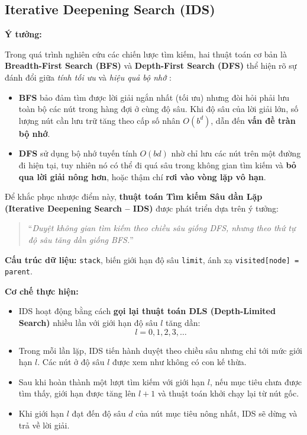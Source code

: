 \subsection{Iterative Deepening Search (IDS)}

\textbf{Ý tưởng: }

Trong quá trình nghiên cứu các chiến lược tìm kiếm, hai thuật toán cơ bản là \textbf{Breadth-First Search (BFS)} và 
\textbf{Depth-First Search (DFS)} thể hiện rõ sự đánh đổi giữa \textit{tính tối ưu} và \textit{hiệu quả bộ nhớ} \cite{russell2021}:

\begin{itemize}
    \item \textbf{BFS} bảo đảm tìm được lời giải ngắn nhất (tối ưu) nhưng đòi hỏi phải lưu toàn bộ các nút trong hàng đợi ở cùng độ sâu. 
    Khi độ sâu của lời giải lớn, số lượng nút cần lưu trữ tăng theo cấp số nhân $O(b^d)$, dẫn đến \textbf{vấn đề tràn bộ nhớ}.
    \item \textbf{DFS} sử dụng bộ nhớ tuyến tính $O(bd)$ nhờ chỉ lưu các nút trên một đường đi hiện tại, 
    tuy nhiên nó có thể đi quá sâu trong không gian tìm kiếm và \textbf{bỏ qua lời giải nông hơn}, 
    hoặc thậm chí \textbf{rơi vào vòng lặp vô hạn}.
\end{itemize}

Để khắc phục nhược điểm này, \textbf{thuật toán Tìm kiếm Sâu dần Lặp (Iterative Deepening Search – IDS)} được phát triển 
dựa trên ý tưởng:
\begin{quote}
    “\textit{Duyệt không gian tìm kiếm theo chiều sâu giống DFS, nhưng theo thứ tự độ sâu tăng dần giống BFS.}”
\end{quote}

\textbf{Cấu trúc dữ liệu:} \texttt{stack}, biến giới hạn độ sâu \texttt{limit}, ánh xạ \texttt{visited[node] = parent}.

\textbf{Cơ chế thực hiện:}
\begin{itemize}
    \item IDS hoạt động bằng cách \textbf{gọi lại thuật toán DLS (Depth-Limited Search)} nhiều lần với giới hạn độ sâu $l$ tăng dần:
    \[
        l = 0, 1, 2, 3, \dots
    \]
    \item Trong mỗi lần lặp, IDS tiến hành duyệt theo chiều sâu nhưng chỉ tới mức giới hạn $l$. Các nút ở độ sâu $l$ được xem như không có con kế thừa.
    \item Sau khi hoàn thành một lượt tìm kiếm với giới hạn $l$, nếu mục tiêu chưa được tìm thấy, giới hạn được tăng lên $l+1$ và thuật toán khởi chạy lại từ nút gốc.
    \item Khi giới hạn $l$ đạt đến độ sâu $d$ của nút mục tiêu nông nhất, IDS sẽ dừng và trả về lời giải.
\end{itemize}

